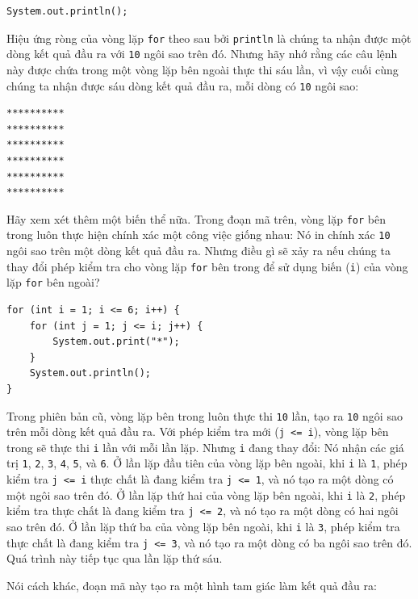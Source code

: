 \begin{verbatim}
System.out.println();
\end{verbatim}

Hiệu ứng ròng của vòng lặp \texttt{for} theo sau bởi \texttt{println} là
chúng ta nhận được một dòng kết quả đầu ra với \texttt{10} ngôi sao trên
đó. Nhưng hãy nhớ rằng các câu lệnh này được chứa trong một vòng lặp bên
ngoài thực thi sáu lần, vì vậy cuối cùng chúng ta nhận được sáu dòng kết
quả đầu ra, mỗi dòng có \texttt{10} ngôi sao:

\begin{verbatim}
********** 
********** 
********** 
********** 
********** 
**********
\end{verbatim}

Hãy xem xét thêm một biến thể nữa. Trong đoạn mã trên, vòng lặp
\texttt{for} bên trong luôn thực hiện chính xác một công việc giống
nhau: Nó in chính xác \texttt{10} ngôi sao trên một dòng kết quả đầu ra.
Nhưng điều gì sẽ xảy ra nếu chúng ta thay đổi phép kiểm tra cho vòng lặp
\texttt{for} bên trong để sử dụng biến (\texttt{i}) của vòng lặp
\texttt{for} bên ngoài?

\begin{verbatim}
for (int i = 1; i <= 6; i++) {
    for (int j = 1; j <= i; j++) {
        System.out.print("*");
    }
    System.out.println();
}
\end{verbatim}

Trong phiên bản cũ, vòng lặp bên trong luôn thực thi \texttt{10} lần,
tạo ra \texttt{10} ngôi sao trên mỗi dòng kết quả đầu ra. Với phép kiểm
tra mới (\texttt{j\ \textless{}=\ i}), vòng lặp bên trong sẽ thực thi
\texttt{i} lần với mỗi lần lặp. Nhưng \texttt{i} đang thay đổi: Nó nhận
các giá trị \texttt{1}, \texttt{2}, \texttt{3}, \texttt{4}, \texttt{5},
và \texttt{6}. Ở lần lặp đầu tiên của vòng lặp bên ngoài, khi \texttt{i}
là \texttt{1}, phép kiểm tra \texttt{j\ \textless{}=\ i} thực chất là
đang kiểm tra \texttt{j\ \textless{}=\ 1}, và nó tạo ra một dòng có một
ngôi sao trên đó. Ở lần lặp thứ hai của vòng lặp bên ngoài, khi
\texttt{i} là \texttt{2}, phép kiểm tra thực chất là đang kiểm tra
\texttt{j\ \textless{}=\ 2}, và nó tạo ra một dòng có hai ngôi sao trên
đó. Ở lần lặp thứ ba của vòng lặp bên ngoài, khi \texttt{i} là
\texttt{3}, phép kiểm tra thực chất là đang kiểm tra
\texttt{j\ \textless{}=\ 3}, và nó tạo ra một dòng có ba ngôi sao trên
đó. Quá trình này tiếp tục qua lần lặp thứ sáu.

Nói cách khác, đoạn mã này tạo ra một hình tam giác làm kết quả đầu ra:

